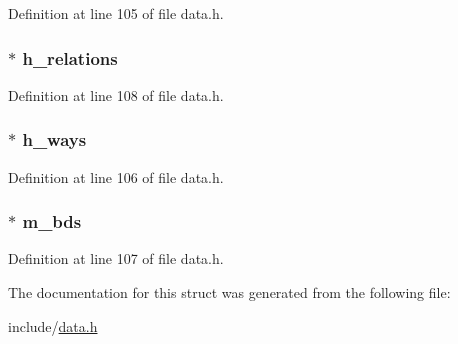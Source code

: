 Definition at line 105 of file data.\+h.

\subsubsection[{\texorpdfstring{h\+\_\+relations}{h_relations}}]{$\ast$ h\+\_\+relations}\hypertarget{struct_map_abc1f65a8dd87d50c657bea6a0b157f56}{}\label{struct_map_abc1f65a8dd87d50c657bea6a0b157f56}


Definition at line 108 of file data.\+h.

\subsubsection[{\texorpdfstring{h\+\_\+ways}{h_ways}}]{$\ast$ h\+\_\+ways}\hypertarget{struct_map_a255d568bce680d722841b9343f6cc90a}{}\label{struct_map_a255d568bce680d722841b9343f6cc90a}


Definition at line 106 of file data.\+h.

\subsubsection[{\texorpdfstring{m\+\_\+bds}{m_bds}}]{$\ast$ m\+\_\+bds}\hypertarget{struct_map_afe75a6a865f0b33f04695c4134b4b37d}{}\label{struct_map_afe75a6a865f0b33f04695c4134b4b37d}


Definition at line 107 of file data.\+h.



The documentation for this struct was generated from the following file\+:\begin{DoxyCompactItemize}
\item 
include/\hyperlink{data_8h}{data.\+h}\end{DoxyCompactItemize}
